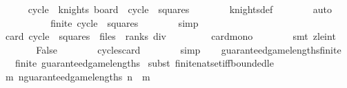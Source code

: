 \begin{isabellebody}
\isanewline
\isanewline
\ \ \ \ \isamarkupfalse%
\ {\isachardoublequoteopen}cycle\ {\isacharbackquote}\ {\isacharparenleft}knights\ board{\isacharparenright}\ {\isasymsubseteq}\ cycle\ {\isacharbackquote}\ squares{\isachardoublequoteclose}\isanewline
\ \ \ \ \ \ \isamarkupfalse%
\ knights{\isacharunderscore}def\isanewline
\ \ \ \ \ \ \isamarkupfalse%
\ auto\isanewline
\isanewline
\ \ \ \ \isamarkupfalse%
\isanewline
\isanewline
\ \ \ \ \isamarkupfalse%
\ {\isachardoublequoteopen}finite\ {\isacharparenleft}cycle\ {\isacharbackquote}\ squares{\isacharparenright}{\isachardoublequoteclose}\isanewline
\ \ \ \ \ \ \isamarkupfalse%
\ simp\isanewline
\isanewline
\ \ \ \ \isamarkupfalse%
\isanewline
\isanewline
\ \ \ \ \isamarkupfalse%
\ {\isachardoublequoteopen}card\ {\isacharparenleft}cycle\ {\isacharbackquote}\ squares{\isacharparenright}\ {\isachargreater}\ {\isacharparenleft}files\ {\isacharasterisk}\ ranks{\isacharparenright}\ div\ {}{\isachardoublequoteclose}\isanewline
\ \ \ \ \ \ \isamarkupfalse%
\ card{\isacharunderscore}mono\isanewline
\ \ \ \ \ \ \isamarkupfalse%
\ {\isacharparenleft}smt\ zle{\isacharunderscore}int{\isacharparenright}\isanewline
\isanewline
\ \ \ \ \isamarkupfalse%
\ \isamarkupfalse%
\ False\isanewline
\ \ \ \ \ \ \isamarkupfalse%
\ cycles{\isacharunderscore}card\isanewline
\ \ \ \ \ \ \isamarkupfalse%
\ simp\isanewline
\ \ \isamarkupfalse%
\isanewline
{}\isamarkupfalse%
%
\endisatagproof
{\isafoldproof}%
%
\isadelimproof
\isanewline
%
\endisadelimproof
\isanewline
{}\isamarkupfalse%
\ guaranteed{\isacharunderscore}game{\isacharunderscore}lengths{\isacharunderscore}finite{\isacharcolon}\ \isanewline
\ \ \ {\isachardoublequoteopen}finite\ guaranteed{\isacharunderscore}game{\isacharunderscore}lengths{\isachardoublequoteclose}\isanewline
%
\isadelimproof
%
\endisadelimproof
%
\isatagproof
{}\isamarkupfalse%
\ {\isacharparenleft}subst\ finite{\isacharunderscore}nat{\isacharunderscore}set{\isacharunderscore}iff{\isacharunderscore}bounded{\isacharunderscore}le{\isacharparenright}\isanewline
\ \ \isamarkupfalse%
\ {\isachardoublequoteopen}{\isasymexists}m{\isachardot}\ {\isasymforall}n{\isasymin}guaranteed{\isacharunderscore}game{\isacharunderscore}lengths{\isachardot}\ n\ {\isasymle}\ m{\isachardoublequoteclose}\isanewline

\end{isabellebody}

